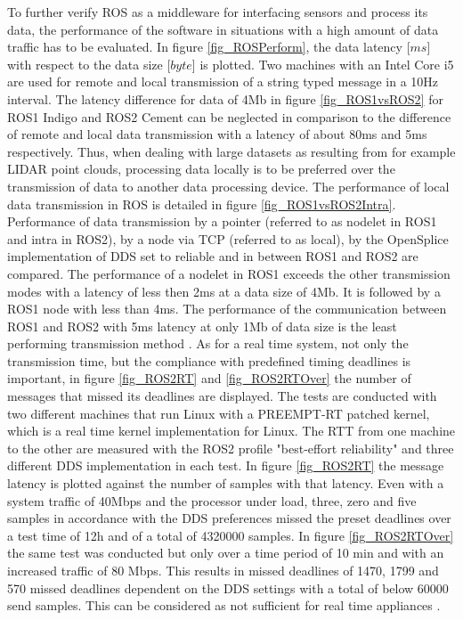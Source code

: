 To further verify \ac{ROS} as a middleware for interfacing sensors and process its data, the performance of the software in situations with a high amount of data traffic has to be evaluated. In figure \ref{fig_ROSPerform}, the data latency [$ms$] with respect to the data size [$byte$] is plotted. Two machines with an Intel Core i5 are used for remote and local transmission of a string typed message in a 10Hz interval. The latency difference for data of 4Mb in figure \ref{fig_ROS1vsROS2} for ROS1 Indigo and ROS2 Cement can be neglected in comparison to the difference of remote and local data transmission with a latency of about 80ms and 5ms respectively. Thus, when dealing with large datasets as resulting from for example \ac{LIDAR} point clouds, processing data locally is to be preferred over the transmission of data to another data processing device. The performance of local data transmission in \ac{ROS} is detailed in figure \ref{fig_ROS1vsROS2Intra}. Performance of data transmission by a pointer (referred to as nodelet in ROS1 and intra in ROS2), by a node via \ac{TCP} (referred to as local), by the OpenSplice implementation of \ac{DDS} set to reliable and in between ROS1 and ROS2 are compared. The performance of a nodelet in ROS1 exceeds the other transmission modes with a latency of less then 2ms at a data size of 4Mb.  It is followed by a ROS1 node with less than 4ms. The performance of the communication between ROS1 and ROS2 with 5ms latency at only 1Mb of data size is the least performing transmission method \cite{ROSDDS}. As for a real time system, not only the transmission time, but the compliance with predefined timing deadlines is important, in figure \ref{fig_ROS2RT} and \ref{fig_ROS2RTOver} the number of messages that missed its deadlines are displayed. The tests are conducted with two different machines that run Linux with a PREEMPT-RT patched kernel, which is a real time kernel implementation for Linux. The \ac{RTT} from one machine to the other are measured with the ROS2 profile "best-effort reliability" and three different \ac{DDS} implementation in each test. In figure \ref{fig_ROS2RT} the message latency is plotted against the number of samples with that latency. Even with a system traffic of 40Mbps and the processor under load, three, zero and five samples in accordance with the \ac{DDS} preferences missed the preset deadlines over a test time of 12h and of a total of 4320000 samples. In figure \ref{fig_ROS2RTOver} the same test was conducted but only over a time period of 10 min and with an increased traffic of 80 Mbps. This results in missed deadlines of 1470, 1799 and 570 missed deadlines dependent on the \ac{DDS} settings with a total of below 60000 send samples. This can be considered as not sufficient for real time appliances \cite{ROSRealtime}.\\

